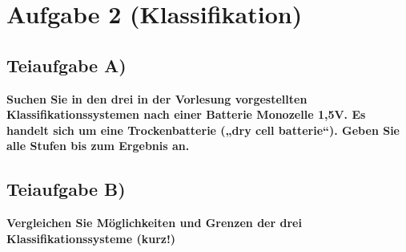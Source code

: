 \section{Aufgabe 2 (Klassifikation)}

\subsection{Teiaufgabe A)}
\textbf{Suchen Sie in den drei in der Vorlesung vorgestellten Klassifikationssystemen nach einer
Batterie Monozelle 1,5V. Es handelt sich um eine Trockenbatterie („dry cell batterie“).
Geben Sie alle Stufen bis zum Ergebnis an.}

\subsection{Teiaufgabe B)}
\textbf{Vergleichen Sie Möglichkeiten und Grenzen der drei Klassifikationssysteme (kurz!)}

\clearpage 